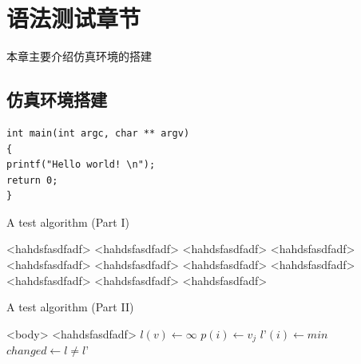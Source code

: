 \chapter{语法测试章节}

本章主要介绍仿真环境的搭建

\section{仿真环境搭建}

\begin{lstlisting}[language={[ANSI]C}] 
int main(int argc, char ** argv) 
{ 
printf("Hello world! \n"); 
return 0; 
} 
\end{lstlisting}

\begin{algorithm}
\caption{A test algorithm (Part I)}
\begin{algorithmic}[1]
\Require <hahdsfasdfadf>
\Ensure <hahdsfasdfadf>
\State <hahdsfasdfadf>
	\State <hahdsfasdfadf>
	\State <hahdsfasdfadf>
\Else 
	\State <hahdsfasdfadf>
\EndIf
{}
	\State <hahdsfasdfadf>
\EndFor
{}
	\State <hahdsfasdfadf>
\EndFor
{}
	\State <hahdsfasdfadf>
\EndWhile
\Repeat
	\State <hahdsfasdfadf>
\Loop
	\State <hahdsfasdfadf>
\EndLoop
\end{algorithmic}
\end{algorithm}

\begin{algorithm}
\caption*{A test algorithm (Part II)}
\begin{algorithmic}[1]
 <body> \EndFunction
\State \Return <hahdsfasdfadf>
\State $l(v) \leftarrow \infty$
\EndFor
\State $p(i) \leftarrow v_j$
\State $l’(i) \leftarrow min$
\State $changed \leftarrow l \not= l’$
\EndProcedure
\end{algorithmic}
\end{algorithm}



